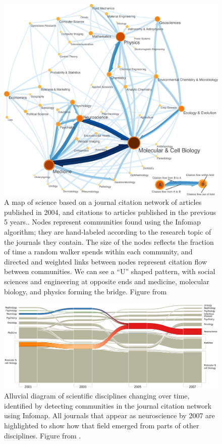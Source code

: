\begin{figure}
\centering
\includegraphics{img/rosvall2008_fig3_journals.jpg}
\caption{A map of science based on a journal citation network of
articles published in 2004, and citations to articles published in the
previous 5 years.. Nodes represent communities found using the Infomap
algorithm; they are hand-labeled according to the research topic of the
journals they contain. The size of the nodes reflects the fraction of
time a random walker spends within each community, and directed and
weighted links between nodes represent citation flow between
communities. We can see a ``U'' shaped pattern, with social sciences and
engineering at opposite ends and medicine, molecular biology, and
physics forming the bridge. Figure from
\autocite{rosvall_maps_2008}}\label{fig:journals}
\end{figure}

\begin{figure}
\centering
\includegraphics{img/rosvall2010_fig3_alluvial.png}
\caption{Alluvial diagram of scientific disciplines changing over time,
identified by detecting communities in the journal citation network
using Infomap. All journals that appear as neuroscience by 2007 are
highlighted to show how that field emerged from parts of other
disciplines. Figure from
\autocite{rosvall_mapping_2010}.}\label{fig:alluvial}
\end{figure}

